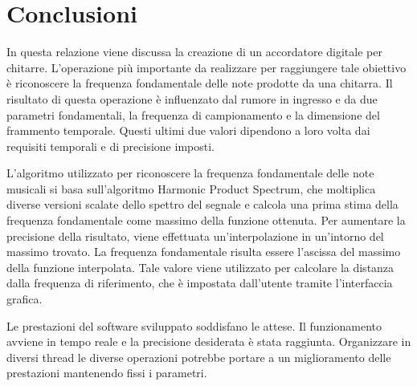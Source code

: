 \chapter{Conclusioni}\label{cap:conclusioni}

In questa relazione viene discussa la creazione di un accordatore digitale per chitarre.
L'operazione più importante da realizzare per raggiungere tale obiettivo è riconoscere la frequenza fondamentale delle note prodotte da una chitarra.
Il risultato di questa operazione è influenzato dal rumore in ingresso e da due parametri fondamentali, la frequenza di campionamento e la dimensione del frammento temporale.
Questi ultimi due valori dipendono a loro volta dai requisiti temporali e di precisione imposti.

L'algoritmo utilizzato per riconoscere la frequenza fondamentale delle note musicali si basa sull'algoritmo Harmonic Product Spectrum, che moltiplica diverse versioni scalate dello spettro del segnale e calcola una prima stima della frequenza fondamentale come massimo della funzione ottenuta.
Per aumentare la precisione della risultato, viene effettuata un'interpolazione in un'intorno del massimo trovato.
La frequenza fondamentale risulta essere l'ascissa del massimo della funzione interpolata.
Tale valore viene utilizzato per calcolare la distanza dalla frequenza di riferimento, che è impostata dall'utente tramite l'interfaccia grafica. 

Le prestazioni del software sviluppato soddisfano le attese.
Il funzionamento avviene in tempo reale e la precisione desiderata è stata raggiunta. 
Organizzare in diversi thread le diverse operazioni potrebbe portare a un miglioramento delle prestazioni mantenendo fissi i parametri.



